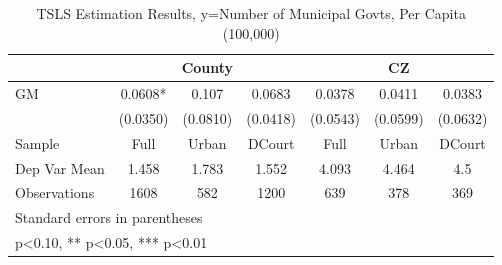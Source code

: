 \begin{table}[htbp]\centering
\def\sym#1{\ifmmode^{#1}\else\(^{#1}\)\fi}
\caption{TSLS Estimation Results, y=Number of Municipal Govts, Per Capita (100,000)}
\begin{tabular}{l*{6}{c}}
\toprule
                &\multicolumn{3}{c}{County}            &\multicolumn{3}{c}{CZ}                \\\cmidrule(lr){2-4}\cmidrule(lr){5-7}
\midrule
GM              &   0.0608*  &    0.107   &   0.0683   &   0.0378   &   0.0411   &   0.0383   \\
                & (0.0350)   & (0.0810)   & (0.0418)   & (0.0543)   & (0.0599)   & (0.0632)   \\
\midrule
Sample          &     Full   &    Urban   &   DCourt   &     Full   &    Urban   &   DCourt   \\
Dep Var Mean    &    1.458   &    1.783   &    1.552   &    4.093   &    4.464   &      4.5   \\
Observations    &     1608   &      582   &     1200   &      639   &      378   &      369   \\
\bottomrule
\multicolumn{7}{l}{\footnotesize Standard errors in parentheses}\\
\multicolumn{7}{l}{\footnotesize * p<0.10, ** p<0.05, *** p<0.01}\\
\end{tabular}
\end{table}
